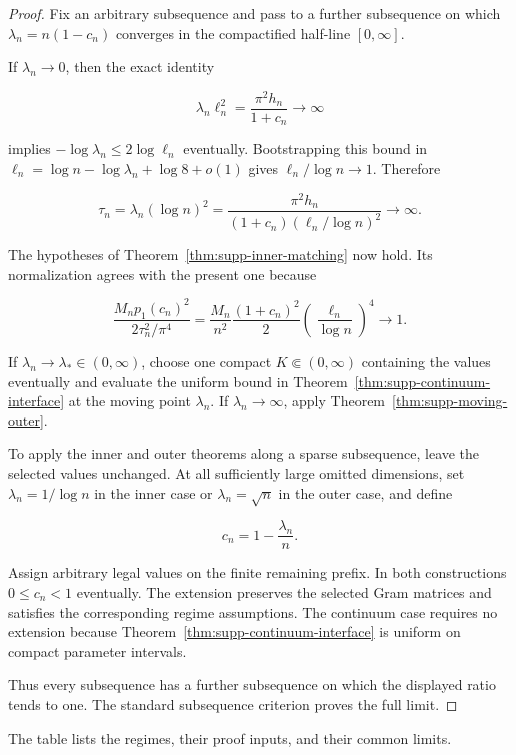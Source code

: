 \begin{proof}
Fix an arbitrary subsequence and pass to a further subsequence on which
\(\lambda_n=n(1-c_n)\) converges in the compactified half-line
\([0,\infty]\).

If \(\lambda_n\to0\), then the exact identity

\[
 \lambda_n\ell_n^2=\frac{\pi^2h_n}{1+c_n}\longrightarrow\infty
\]

implies \(-\log\lambda_n\le2\log\ell_n\) eventually.  Bootstrapping this
bound in
\(\ell_n=\log n-\log\lambda_n+\log8+o(1)\) gives
\(\ell_n/\log n\to1\).  Therefore

\[
 \tau_n=\lambda_n(\log n)^2
 =\frac{\pi^2h_n}
 {(1+c_n)(\ell_n/\log n)^2}\longrightarrow\infty.
\]

The hypotheses of Theorem~\ref{thm:supp-inner-matching} now hold.  Its
normalization agrees with the present one because

\[
 \frac{M_np_1(c_n)^2}{2\tau_n^2/\pi^4}
 =\frac{M_n}{n^2}\frac{(1+c_n)^2}{2}
  \left(\frac{\ell_n}{\log n}\right)^4
 \longrightarrow1.
\]

If \(\lambda_n\to\lambda_*\in(0,\infty)\), choose one compact
\(K\Subset(0,\infty)\) containing the values eventually and evaluate the
uniform bound in Theorem~\ref{thm:supp-continuum-interface} at the moving
point \(\lambda_n\).  If \(\lambda_n\to\infty\), apply
Theorem~\ref{thm:supp-moving-outer}.

To apply the inner and outer theorems along a sparse subsequence, leave the
selected values unchanged.  At all sufficiently large omitted dimensions, set
\(\lambda_n=1/\log n\) in the inner case or \(\lambda_n=\sqrt n\) in the outer
case, and define

\[
 c_n=1-\frac{\lambda_n}{n}.
\]

Assign arbitrary legal values on the finite remaining prefix. In both
constructions \(0\le c_n<1\) eventually. The extension preserves the selected
Gram matrices and satisfies the corresponding regime assumptions.
The continuum case requires no extension because
Theorem~\ref{thm:supp-continuum-interface} is uniform on compact parameter
intervals.

Thus every subsequence has a further subsequence on which the displayed
ratio tends to one. The standard subsequence criterion proves the full limit.
\end{proof}

The table lists the regimes, their proof inputs, and their common limits.


